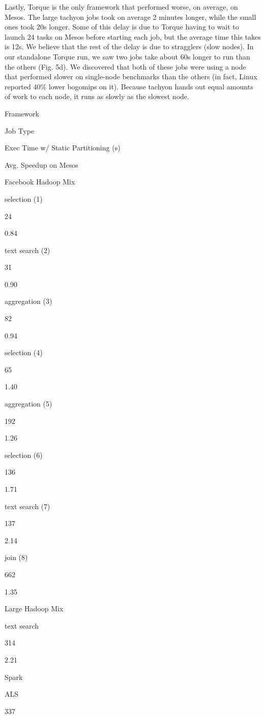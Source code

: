 \documentclass[
]{article}
\begin{document}
Lastly, Torque is the only framework that performed worse, on average,
on Mesos. The large tachyon jobs took on average 2 minutes longer, while
the small ones took 20s longer. Some of this delay is due to Torque
having to wait to launch 24 tasks on Mesos before starting each job, but
the average time this takes is 12s. We believe that the rest of the
delay is due to stragglers (slow nodes). In our standalone Torque run,
we saw two jobs take about 60s longer to run than the others (Fig. 5d).
We discovered that both of these jobs were using a node that performed
slower on single-node benchmarks than the others (in fact, Linux
reported 40\% lower bogomips on it). Because tachyon hands out equal
amounts of work to each node, it runs as slowly as the slowest node.

Framework

Job Type

Exec Time w/ Static Partitioning (s)

Avg. Speedup on Mesos

Facebook Hadoop Mix

selection (1)

24

0.84

text search (2)

31

0.90

aggregation (3)

82

0.94

selection (4)

65

1.40

aggregation (5)

192

1.26

selection (6)

136

1.71

text search (7)

137

2.14

join (8)

662

1.35

Large Hadoop Mix

text search

314

2.21

Spark

ALS

337
\end{document}
